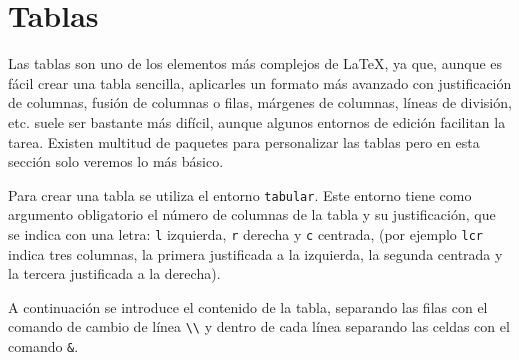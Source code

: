 \documentclass[
  spanish,
  a4paper,
]{scrreport}
\theoremstyle{definition}
\theoremstyle{remark}
\begin{document}
\chapter{Tablas}\label{sec-tablas}

Las tablas son uno de los elementos más complejos de LaTeX, ya que,
aunque es fácil crear una tabla sencilla, aplicarles un formato más
avanzado con justificación de columnas, fusión de columnas o filas,
márgenes de columnas, líneas de división, etc. suele ser bastante más
difícil, aunque algunos entornos de edición facilitan la tarea. Existen
multitud de paquetes para personalizar las tablas pero en esta sección
solo veremos lo más básico.

Para crear una tabla se utiliza el entorno \texttt{tabular}. Este
entorno tiene como argumento obligatorio el número de columnas de la
tabla y su justificación, que se indica con una letra: \texttt{l}
izquierda, \texttt{r} derecha y \texttt{c} centrada, (por ejemplo
\texttt{lcr} indica tres columnas, la primera justificada a la
izquierda, la segunda centrada y la tercera justificada a la derecha).

A continuación se introduce el contenido de la tabla, separando las
filas con el comando de cambio de línea
\texttt{\textbackslash{}\textbackslash{}} y dentro de cada línea
separando las celdas con el comando \texttt{\&}.
\end{document}
